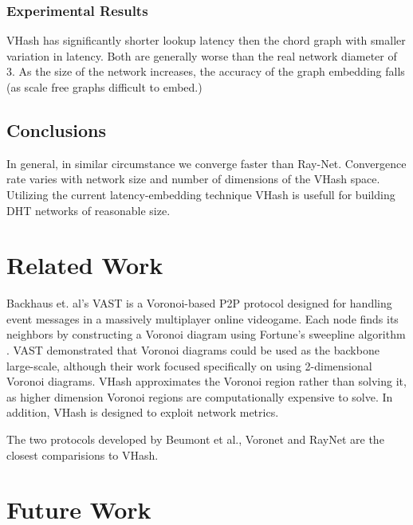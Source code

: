 \documentclass{IEEEtran}
\begin{document}
\subsubsection{Experimental Results}
VHash has significantly shorter lookup latency then the chord graph with smaller variation in latency.
Both are generally worse than the real network diameter of 3.
As the size of the network increases, the accuracy of the graph embedding falls (as scale free graphs difficult to embed.)

\subsection{Conclusions}
In general, in similar circumstance we converge faster than Ray-Net.
Convergence rate varies with network size and number of dimensions of the VHash space.
Utilizing the current latency-embedding technique VHash is usefull for building DHT networks of reasonable size.

\section{Related Work}


Backhaus et. al's  VAST \cite{Backhaus:2007:VAS:1326257.1326266} is a Voronoi-based P2P protocol designed for handling event messages in a massively multiplayer online videogame.  
Each node finds its neighbors by constructing a Voronoi diagram using Fortune's sweepline algorithm \cite{fortune1987sweepline}.  
VAST demonstrated that Voronoi diagrams could be used as the backbone  large-scale, although their work focused specifically on using 2-dimensional Voronoi diagrams.  
VHash approximates the Voronoi region rather than solving it, as higher dimension Voronoi regions are computationally expensive to solve.
In addition, VHash is designed to exploit network metrics.

The two protocols developed by Beumont et al., Voronet \cite{voronet} and RayNet \cite{raynet} are the closest comparisions to VHash.


 

\section{Future Work}



\end{document}
